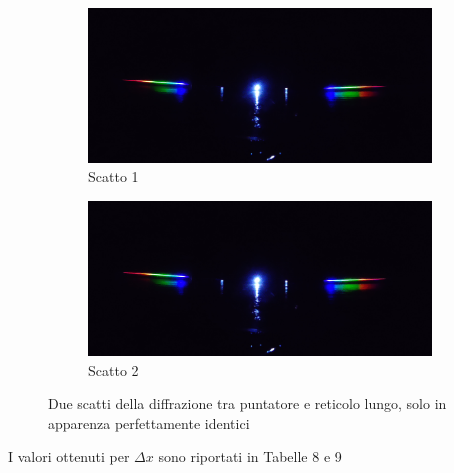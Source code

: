 \documentclass{article}
\begin{document}
\begin{figure}[h]
    \centering
    \begin{subfigure}[b]{0.4\linewidth}
        \includegraphics[width=\linewidth]{LedLungo1_OFF.jpg}
        \caption{Scatto 1}
    \end{subfigure}

    \begin{subfigure}[b]{0.4\linewidth}
        \includegraphics[width=\linewidth]{LedLungo3_OFF.jpg}
        \caption{Scatto 2}
    \end{subfigure}
    \caption{Due scatti della diffrazione tra puntatore e reticolo lungo, solo in apparenza perfettamente identici}
\end{figure}
\pagebreak
I valori ottenuti per $\Delta x$ sono riportati in Tabelle 8 e 9
\end{document}
